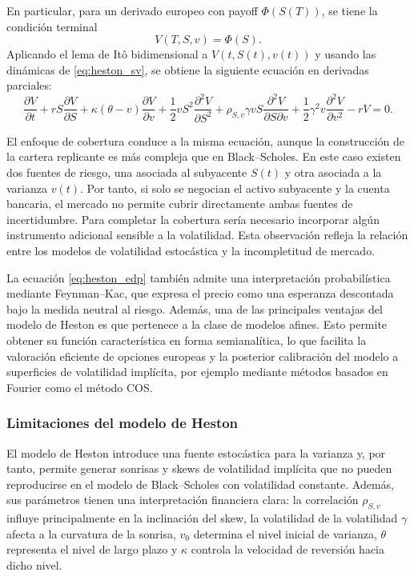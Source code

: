 En particular, para un derivado europeo con payoff \(\Phi(S(T))\), se tiene la condición terminal
\[
V(T,S,v)=\Phi(S).
\]
Aplicando el lema de Itô bidimensional a \(V(t,S(t),v(t))\) y usando las dinámicas de \ref{eq:heston_sv}, se obtiene la siguiente ecuación en derivadas parciales:
\begin{equation}
\label{eq:heston_edp}
\frac{\partial V}{\partial t}
+rS\frac{\partial V}{\partial S}
+\kappa(\theta-v)\frac{\partial V}{\partial v}
+\frac{1}{2}vS^2\frac{\partial^2 V}{\partial S^2}
+\rho_{S,v}\gamma vS\frac{\partial^2 V}{\partial S\partial v}
+\frac{1}{2}\gamma^2v\frac{\partial^2 V}{\partial v^2}
-rV=0.
\end{equation}

El enfoque de cobertura conduce a la misma ecuación, aunque la construcción de la cartera replicante es más compleja que en Black--Scholes. En este caso existen dos fuentes de riesgo, una asociada al subyacente \(S(t)\) y otra asociada a la varianza \(v(t)\). Por tanto, si solo se negocian el activo subyacente y la cuenta bancaria, el mercado no permite cubrir directamente ambas fuentes de incertidumbre. Para completar la cobertura sería necesario incorporar algún instrumento adicional sensible a la volatilidad. Esta observación refleja la relación entre los modelos de volatilidad estocástica y la incompletitud de mercado. \medskip

La ecuación \ref{eq:heston_edp} también admite una interpretación probabilística mediante Feynman--Kac, que expresa el precio como una esperanza descontada bajo la medida neutral al riesgo. Además, una de las principales ventajas del modelo de Heston es que pertenece a la clase de modelos afines. Esto permite obtener su función característica en forma semianalítica, lo que facilita la valoración eficiente de opciones europeas y la posterior calibración del modelo a superficies de volatilidad implícita, por ejemplo mediante métodos basados en Fourier como el método COS.

\subsubsection*{Limitaciones del modelo de Heston}

El modelo de Heston introduce una fuente estocástica para la varianza y, por tanto, permite generar sonrisas y skews de volatilidad implícita que no pueden reproducirse en el modelo de Black--Scholes con volatilidad constante. Además, sus parámetros tienen una interpretación financiera clara: la correlación \(\rho_{S,v}\) influye principalmente en la inclinación del skew, la volatilidad de la volatilidad \(\gamma\) afecta a la curvatura de la sonrisa, \(v_0\) determina el nivel inicial de varianza, \(\theta\) representa el nivel de largo plazo y \(\kappa\) controla la velocidad de reversión hacia dicho nivel.

